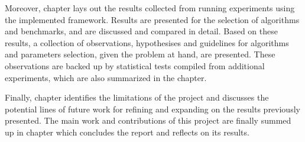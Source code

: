 Moreover, chapter  lays out the results collected from running experiments using the implemented framework.
Results are presented for the selection of algorithms and benchmarks, and are discussed and compared in detail. Based on these results, a collection of
observations, hypothesises and guidelines for algorithms and parameters selection, given the problem at hand, are presented. These observations are
backed up by statistical tests compiled from additional experiments, which are also summarized in the chapter.

Finally, chapter  identifies the limitations of the project and discusses the potential lines of future work for refining and expanding on the results
previously presented. The main work and contributions of this project are finally summed up in chapter  which concludes the report and reflects on its
results.
